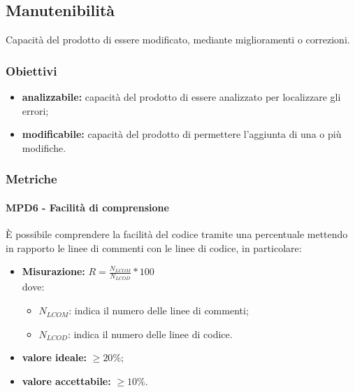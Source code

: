 \subsection{Manutenibilità}
Capacità del prodotto di essere modificato, mediante miglioramenti o correzioni.
\subsubsection{Obiettivi}
\begin{itemize}
	\item \textbf{analizzabile:} capacità del prodotto di essere analizzato per localizzare gli errori;
	\item \textbf{modificabile:} capacità del prodotto di permettere l'aggiunta di una o più modifiche.
\end{itemize}
\subsubsection{Metriche}
\paragraph{MPD6 - Facilità di comprensione}  È possibile comprendere la facilità del codice tramite una percentuale mettendo in rapporto le linee di commenti con le linee di codice, in particolare:
\begin{itemize}
	\item \textbf{Misurazione:} \begin{math}R=\frac{N_{LCOM}}{N_{LCOD}}*100\end{math}\\
	dove:
	\begin {itemize}
		\item \begin{math}N_{LCOM}\end{math}: indica il numero delle linee di commenti;
		\item \begin{math}N_{LCOD}\end{math}: indica il numero delle linee di codice.
	\end{itemize}
	\item \textbf{valore ideale:} \begin{math}\geq20\%\end{math};
	\item \textbf{valore accettabile:} \begin{math}\geq10\%\end{math}.
\end{itemize}
